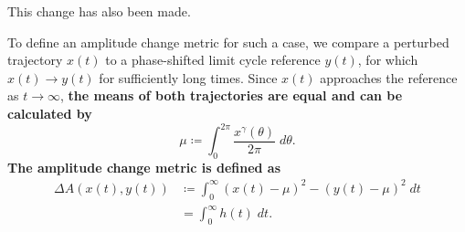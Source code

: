 \documentclass[11pt, letterpaper]{article}
\newenvironment{manuscript}[1]{\begin{center}\begin{tcolorbox}[colback=green!5!white,colframe=green!75!black,width=0.8\textwidth,title={#1},breakable,fonttitle=\bfseries]}{\end{tcolorbox}\end{center}}
\begin{document}
This change has also been made.

\begin{manuscript}{Page 7}
To define an amplitude change metric for such a case, we compare a perturbed trajectory $x(t)$ to a phase-shifted limit cycle reference $y(t)$, for which $x(t) \to y(t)$ for sufficiently long times.
Since $x(t)$ approaches the reference as $t \to \infty$, {\bfseries the means of both trajectories are equal and can be calculated by
\begin{equation}
  \mu \coloneqq \int_0^{2\pi} \frac{x^\gamma(\theta)}{2\pi} \; d\theta.
  \tag{20}
\end{equation}
The amplitude change metric is defined as}
\begin{equation}
  \begin{aligned}
    \Delta A (x(t), y(t)) &\coloneqq \int_0^\infty (x(t) - \mu)^2 - (y(t) - \mu)^2 \; dt\\
    &= \int_0^\infty h(t) \; dt.
  \end{aligned}
  \tag{21}
\end{equation}
\end{manuscript}
\end{document}
